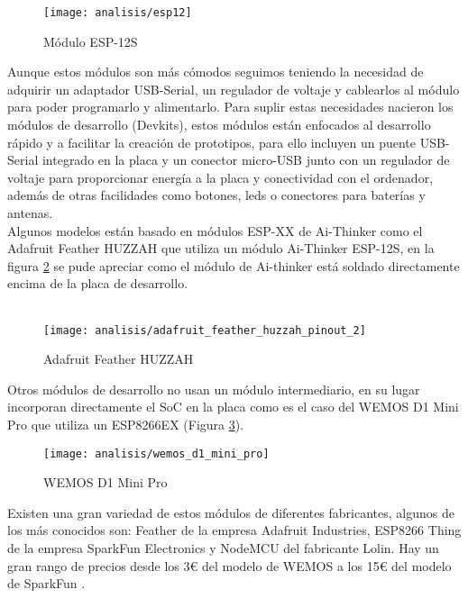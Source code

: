 \documentclass[../proyecto.tex]{subfiles}
\begin{document}
\begin{figure}[H]
\centering
\texttt{[image: analisis/esp12]}
\caption{Módulo ESP-12S}
\label{fig:esp12}
\end{figure}

\newpage

Aunque estos módulos son más cómodos seguimos teniendo la necesidad de adquirir un adaptador USB-Serial, un regulador de voltaje y cablearlos al módulo para poder programarlo y alimentarlo. Para suplir estas necesidades nacieron los módulos de desarrollo (Devkits), estos módulos están enfocados al desarrollo rápido y a facilitar la creación de prototipos, para ello incluyen un puente USB-Serial integrado en la placa y un conector micro-USB junto con un regulador de voltaje para proporcionar energía a la placa y conectividad con el ordenador, además de otras facilidades como botones, leds o conectores para baterías y antenas.\\

Algunos modelos están basado en módulos ESP-XX de Ai-Thinker como el Adafruit Feather HUZZAH \cite{adafruit_feather_huzzah} que utiliza un módulo Ai-Thinker ESP-12S, en la figura \ref{fig:adafruit_feather_huzzah_pinout_2} se pude apreciar como el módulo de Ai-thinker está soldado directamente encima de la placa de desarrollo.\\~\\

\begin{figure}[H]
\centering
\texttt{[image: analisis/adafruit\_feather\_huzzah\_pinout\_2]}
\caption{Adafruit Feather HUZZAH}
\label{fig:adafruit_feather_huzzah_pinout_2}
\end{figure}

Otros módulos de desarrollo no usan un módulo intermediario, en su lugar incorporan directamente el SoC en la placa como es el caso del WEMOS D1 Mini Pro \cite{wemos_d1_mini_pro} que utiliza un ESP8266EX (Figura \ref{fig:wemos_d1_mini_pro}).\\

\begin{figure}[h]
\centering
\texttt{[image: analisis/wemos\_d1\_mini\_pro]}
\caption{WEMOS D1 Mini Pro}
\label{fig:wemos_d1_mini_pro}
\end{figure}

Existen una gran variedad de estos módulos de diferentes fabricantes, algunos de los más conocidos son:  Feather de la empresa Adafruit Industries, ESP8266 Thing de la empresa SparkFun Electronics y NodeMCU del fabricante Lolin. Hay un gran rango de precios desde los 3€ del modelo de WEMOS a los 15€ del modelo de SparkFun \cite{espressif_provider_digikey} \cite{espressif_provider_mouser}\cite{sparkfun_thing_official_page}.\\
\end{document}
